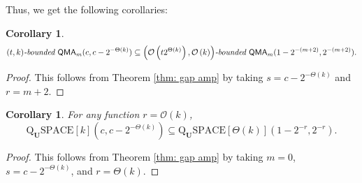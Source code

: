 \documentclass[11pt]{article}
\newtheorem{corollary}[theorem]{Corollary}
\theoremstyle{definition}
\theoremstyle{remark}
\newcommand\QMA{{\sf{QMA}}}
\newcommand\bddQMA[5]{{\left(#1,#2\right)}\textit{-bounded }\QMA_{#3}(#4,#5)}
\newcommand{\classfont}{\mathrm}
\newcommand{\Unitary}{\mathbf{U}}
\newcommand{\unitaryQSPACE}[3]{\classfont{Q}_\Unitary\classfont{SPACE}[#1](#2,#3)}
\begin{document}
Thus, we get the following corollaries:
\begin{corollary}\label{obvious1}
\[
\bddQMA{t}{k}{m}{c}{c-2^{-\Theta(k)}}\subseteq\bddQMA{\mathcal{O}\left(t2^{\Theta(k)}\right)}{\mathcal{O}\left(k\right)}{m}{1-2^{-(m+2)}}{2^{-(m+2)}}.
\]
\end{corollary}
\begin{proof}
This follows from Theorem \ref{thm: gap amp} by taking $s = c-2^{-\Theta(k)}$ and $r = m+2$.
\end{proof}
\begin{corollary} \label{obvious2} For any function $r = \mathcal{O}(k)$,
\[
\unitaryQSPACE{k}{c}{c-2^{-\Theta(k)}} \subseteq
\unitaryQSPACE{\Theta(k)}{1-2^{-r}}{2^{-r}}.
\]
\end{corollary}
\begin{proof}
This follows from Theorem \ref{thm: gap amp} by taking $m=0$, $s = c-2^{-\Theta(k)}$, and $r = \Theta(k)$.
\end{proof}
\end{document}
